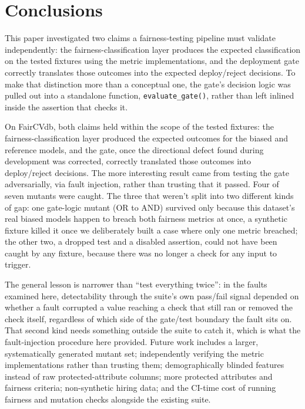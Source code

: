 \documentclass[]{einformatica}
\begin{document}
\section{Conclusions}\label{sec:Conclusions}

This paper investigated two claims a fairness-testing pipeline must validate independently: the fairness-classification layer produces the expected classification on the tested fixtures using the metric implementations, and the deployment gate correctly translates those outcomes into the expected deploy/reject decisions. To make that distinction more than a conceptual one, the gate's decision logic was pulled out into a standalone function, \texttt{evaluate\_gate()}, rather than left inlined inside the assertion that checks it.

On FairCVdb, both claims held within the scope of the tested fixtures: the fairness-classification layer produced the expected outcomes for the biased and reference models, and the gate, once the directional defect found during development was corrected, correctly translated those outcomes into deploy/reject decisions. The more interesting result came from testing the gate adversarially, via fault injection, rather than trusting that it passed. Four of seven mutants were caught. The three that weren't split into two different kinds of gap: one gate-logic mutant (OR to AND) survived only because this dataset's real biased models happen to breach both fairness metrics at once, a synthetic fixture killed it once we deliberately built a case where only one metric breached; the other two, a dropped test and a disabled assertion, could not have been caught by any fixture, because there was no longer a check for any input to trigger.

The general lesson is narrower than ``test everything twice'': in the faults examined here, detectability through the suite's own pass/fail signal depended on whether a fault corrupted a value reaching a check that still ran or removed the check itself, regardless of which side of the gate/test boundary the fault sits on. That second kind needs something outside the suite to catch it, which is what the fault-injection procedure here provided. Future work includes a larger, systematically generated mutant set; independently verifying the metric implementations rather than trusting them; demographically blinded features instead of raw protected-attribute columns; more protected attributes and fairness criteria; non-synthetic hiring data; and the CI-time cost of running fairness and mutation checks alongside the existing suite.
\end{document}
